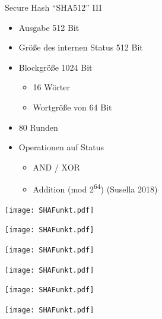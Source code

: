 \documentclass[
  10pt,
  ignorenonframetext,
  aspectratio=169,
]{beamer}
\providecommand{\tightlist}{%
  \setlength{\itemsep}{0pt}\setlength{\parskip}{0pt}}
\begin{document}
\begin{frame}{Secure Hash ``SHA512'' III}
\protect\hypertarget{secure-hash-sha512-iii}{}
\begin{itemize}
\tightlist
\item
  Ausgabe 512 Bit
\item
  Größe des internen Status 512 Bit
\item
  Blockgröße 1024 Bit

  \begin{itemize}
  \tightlist
  \item
    16 Wörter
  \item
    Wortgröße von 64 Bit
  \end{itemize}
\item
  80 Runden
\item
  Operationen auf Status

  \begin{itemize}
  \tightlist
  \item
    AND / XOR
  \item
    Addition (mod 2\textsuperscript{64}) (Susella 2018)
  \end{itemize}
\end{itemize}
\end{frame}

\begin{frame}{}
\protect\hypertarget{section-4}{}
\texttt{[image: SHAFunkt.pdf]}
\end{frame}

\begin{frame}{}
\protect\hypertarget{section-5}{}
\texttt{[image: SHAFunkt.pdf]}
\end{frame}

\begin{frame}{}
\protect\hypertarget{section-6}{}
\texttt{[image: SHAFunkt.pdf]}
\end{frame}

\begin{frame}{}
\protect\hypertarget{section-7}{}
\texttt{[image: SHAFunkt.pdf]}
\end{frame}

\begin{frame}{}
\protect\hypertarget{section-8}{}
\texttt{[image: SHAFunkt.pdf]}
\end{frame}

\begin{frame}{}
\protect\hypertarget{section-9}{}
\texttt{[image: SHAFunkt.pdf]}
\end{frame}
\end{document}
